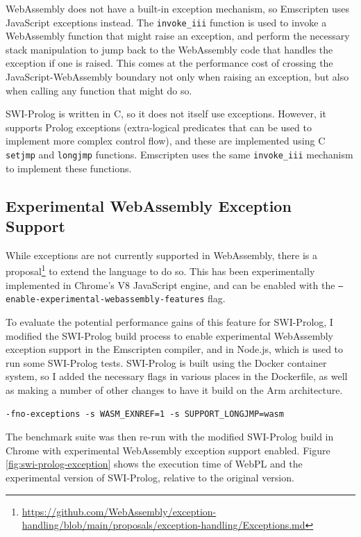WebAssembly does not have a built-in exception mechanism, so Emscripten uses JavaScript exceptions instead. The \texttt{invoke\_iii} function is used to invoke a WebAssembly function that might raise an exception, and perform the necessary stack manipulation to jump back to the WebAssembly code that handles the exception if one is raised. This comes at the performance cost of crossing the JavaScript-WebAssembly boundary not only when raising an exception, but also when calling any function that might do so.

SWI-Prolog is written in C, so it does not itself use exceptions. However, it supports Prolog exceptions (extra-logical predicates that can be used to implement more complex control flow), and these are implemented using C \texttt{setjmp} and \texttt{longjmp} functions. Emscripten uses the same \texttt{invoke\_iii} mechanism to implement these functions.

\subsection{Experimental WebAssembly Exception Support}

While exceptions are not currently supported in WebAssembly, there is a proposal\footnote{\url{https://github.com/WebAssembly/exception-handling/blob/main/proposals/exception-handling/Exceptions.md}} to extend the language to do so. This has been experimentally implemented in Chrome's V8 JavaScript engine, and can be enabled with the \texttt{--enable-experimental-webassembly-features} flag.

To evaluate the potential performance gains of this feature for SWI-Prolog, I modified the SWI-Prolog build process to enable experimental WebAssembly exception support in the Emscripten compiler, and in Node.js, which is used to run some SWI-Prolog tests. SWI-Prolog is built using the Docker container system, so I added the necessary flags in various places in the Dockerfile, as well as making a number of other changes to have it build on the Arm architecture.

\vspace*{-1em}

\begin{verbatim}
-fno-exceptions -s WASM_EXNREF=1 -s SUPPORT_LONGJMP=wasm
\end{verbatim}

\vspace*{-1em}

The benchmark suite was then re-run with the modified SWI-Prolog build in Chrome with experimental WebAssembly exception support enabled. Figure \ref{fig:swi-prolog-exception} shows the execution time of WebPL and the experimental version of SWI-Prolog, relative to the original version.

